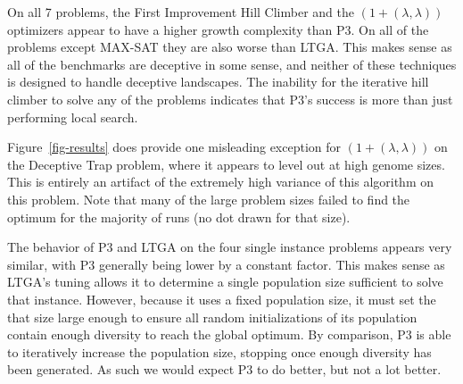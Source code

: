 \documentclass{sig-alternate}
\begin{document}
On all 7 problems, the First Improvement Hill Climber and the $(1+(\lambda,\lambda))$
optimizers appear to have a higher growth complexity than P3.  On all of the problems
except MAX-SAT they are also worse than LTGA.  This makes sense as all of the
benchmarks are deceptive in some sense, and neither of these techniques is designed
to handle deceptive landscapes.  The inability for the iterative hill climber to solve
any of the problems indicates that P3's success is more than just performing local search.

Figure~\ref{fig-results} does provide one misleading
exception for $(1+(\lambda,\lambda))$ on the Deceptive Trap problem, where it appears to
level out at high genome sizes.  This is entirely an artifact of the extremely high
variance of this algorithm on this problem.  Note that many of the large problem
sizes failed to find the optimum for the majority of runs (no dot drawn for that size).

The behavior of P3 and LTGA on the four single instance problems appears very similar,
with P3 generally being lower by a constant factor.  This makes sense as LTGA's
tuning allows it to determine a single population size sufficient to solve that
instance.  However, because it uses a fixed population size, it must set the that
size large enough to ensure all random initializations of its population
contain enough diversity to reach the global optimum.  By comparison, P3 is able to
iteratively increase the population size, stopping once enough diversity has been generated.
As such we would expect P3 to do better, but not a lot better.
\end{document}
